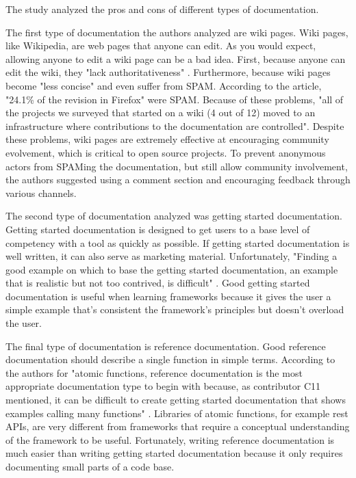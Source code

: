 \documentclass[titlepage]{article}
\begin{document}
The study analyzed the pros and cons of different types of documentation. 

The first type of documentation the authors analyzed are wiki pages. Wiki pages, like Wikipedia, are web pages that anyone can edit. As you would expect, allowing anyone to edit a wiki page can be a bad idea. First, because anyone can edit the wiki, they "lack authoritativeness" \cite[p.5]{Dagenais:2010:CED:1882291.1882312}. Furthermore, because wiki pages become "less concise" \cite[p.5]{Dagenais:2010:CED:1882291.1882312} and even suffer from SPAM. According to the article, "24.1\% of the revision in Firefox"\cite[p.5]{Dagenais:2010:CED:1882291.1882312} were SPAM. Because of these problems, "all of the projects we surveyed that started on a wiki (4 out of 12) moved to an infrastructure where contributions to the documentation are controlled"\cite[p.5]{Dagenais:2010:CED:1882291.1882312}. Despite these problems, wiki pages are extremely effective at encouraging community evolvement, which is critical to open source projects. To prevent anonymous actors from SPAMing the documentation, but still allow community involvement, the authors suggested using a comment section and encouraging feedback through various channels.

The second type of documentation analyzed was getting started documentation. Getting started documentation is designed to get users to a base level of competency with a tool as quickly as possible. If getting started documentation is well written, it can also serve as marketing material. Unfortunately, "Finding a good example on which to base the getting started documentation, an example that is realistic but not too contrived, is difficult" \cite[p.6 Contributor 11]{Dagenais:2010:CED:1882291.1882312}. Good getting started documentation is useful when learning frameworks because it gives the user a simple example that's consistent the framework's principles but doesn't overload the user.

The final type of documentation is reference documentation. Good reference documentation should describe a single function in simple terms. According to the authors for "atomic functions, reference documentation is the most appropriate documentation type to begin with because, as contributor C11 mentioned, it can be difficult to create getting started documentation that shows examples calling many functions" \cite[p.6]{Dagenais:2010:CED:1882291.1882312}. Libraries of atomic functions, for example rest APIs, are very different from frameworks that require a conceptual understanding of the framework to be useful. Fortunately, writing reference documentation is much easier than writing getting started documentation because it only requires documenting small parts of a code base. 
\end{document}
